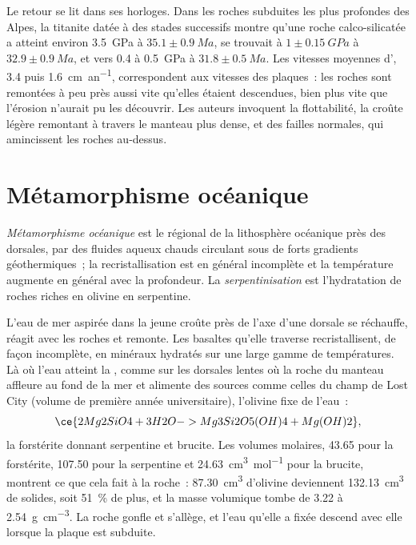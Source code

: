 Le retour se lit dans ses horloges. Dans les roches subduites les plus profondes des Alpes,
la titanite datée à des stades successifs montre qu'une roche calco-silicatée a atteint environ
\qty{3.5}{GPa} à $35.1 \pm \qty{0.9}{Ma}$, se trouvait à $1 \pm \qty{0.15}{GPa}$ à $32.9 \pm
\qty{0.9}{Ma}$, et vers 0.4 à \qty{0.5}{GPa} à $31.8 \pm \qty{0.5}{Ma}$. Les
vitesses moyennes d', 3.4 puis \qty{1.6}{cm.an^{-1}}, correspondent aux vitesses des plaques~: les roches
sont remontées à peu près aussi vite qu'elles étaient descendues, bien plus vite que l'érosion n'aurait pu les
découvrir. Les auteurs invoquent la flottabilité, la croûte légère remontant à travers le manteau plus dense, et
des failles normales, qui amincissent les roches au-dessus.

\section{Métamorphisme océanique}\label{sec:b2:pt-paths:ocean-floor}

\begin{definition}\label{def:b2:pt-paths:ocean-floor}
\emph{Métamorphisme océanique} est le  régional de la
lithosphère océanique près des dorsales, par des fluides aqueux chauds
circulant sous de forts gradients géothermiques~; la recristallisation est en général incomplète
et la température augmente en général avec la profondeur. La \emph{serpentinisation}
est l'hydratation de roches riches en olivine en serpentine.
\end{definition}

L'eau de mer aspirée dans la jeune croûte près de l'axe d'une dorsale se réchauffe, réagit avec les roches et
remonte. Les basaltes qu'elle traverse recristallisent, de façon incomplète, en minéraux hydratés
sur une large gamme de températures. Là où l'eau atteint la , comme sur
les dorsales lentes où la roche du manteau affleure au fond de la mer et alimente des sources comme
celles du champ de Lost City (volume de première année universitaire), l'olivine fixe de l'eau~:
\[
\ce{2 Mg2SiO4 + 3 H2O -> Mg3Si2O5(OH)4 + Mg(OH)2},
\]
la forstérite donnant serpentine et brucite. Les volumes molaires, 43.65 pour la forstérite, 107.50
pour la serpentine et \qty{24.63}{cm^3.mol^{-1}} pour la brucite, montrent ce que cela fait à la roche~:
\qty{87.30}{cm^3} d'olivine deviennent \qty{132.13}{cm^3} de solides, soit \qty{51}{\percent}
de plus, et la masse volumique tombe de 3.22 à \qty{2.54}{g.cm^{-3}}. La roche gonfle et
s'allège, et l'eau qu'elle a fixée descend avec elle lorsque la plaque est subduite.

